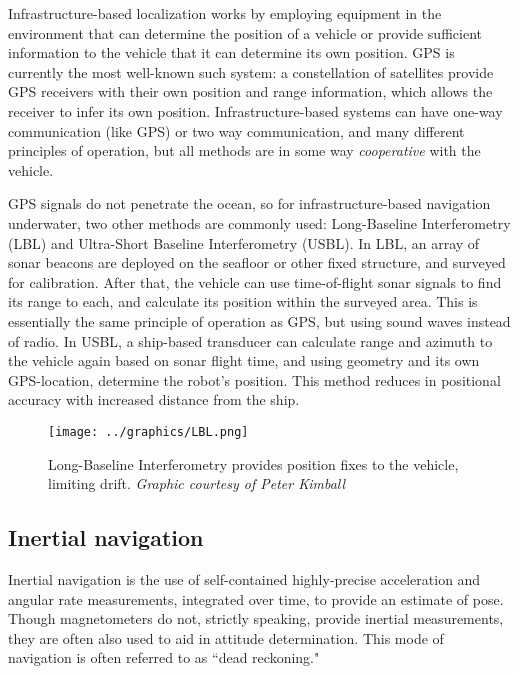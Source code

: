 Infrastructure-based localization works by employing equipment in the environment that can determine the position of a vehicle or provide sufficient information to the vehicle that it can determine its own position. GPS is currently the most well-known such system: a constellation of satellites provide GPS receivers with their own position and range information, which allows the receiver to infer its own position. Infrastructure-based systems can have one-way communication (like GPS) or two way communication, and many different principles of operation, but all methods are in some way \emph{cooperative} with the vehicle. 

GPS signals do not penetrate the ocean, so for infrastructure-based navigation underwater, two other methods are commonly used: Long-Baseline Interferometry (LBL) and Ultra-Short Baseline Interferometry (USBL). In LBL, an array of sonar beacons are deployed on the seafloor or other fixed structure, and surveyed for calibration. After that, the vehicle can use time-of-flight sonar signals to find its range to each, and calculate its position within the surveyed area. This is essentially the same principle of operation as GPS, but using sound waves instead of radio. In USBL, a ship-based transducer can calculate range and azimuth to the vehicle again based on sonar flight time, and using geometry and its own GPS-location, determine the robot's position. This method reduces in positional accuracy with increased distance from the ship. 

\begin{figure}[htbp]
   \centering
   \texttt{[image: ../graphics/LBL.png]} %
   \caption{Long-Baseline Interferometry provides position fixes to the vehicle, limiting drift. \emph{Graphic courtesy of Peter Kimball}}
   \label{fig:LBL}
\end{figure}

\subsection{Inertial navigation}

Inertial navigation is the use of self-contained highly-precise acceleration and angular rate measurements, integrated over time, to provide an estimate of pose. Though magnetometers do not, strictly speaking, provide inertial measurements, they are often also used to aid in attitude determination. This mode of navigation is often referred to as ``dead reckoning."


